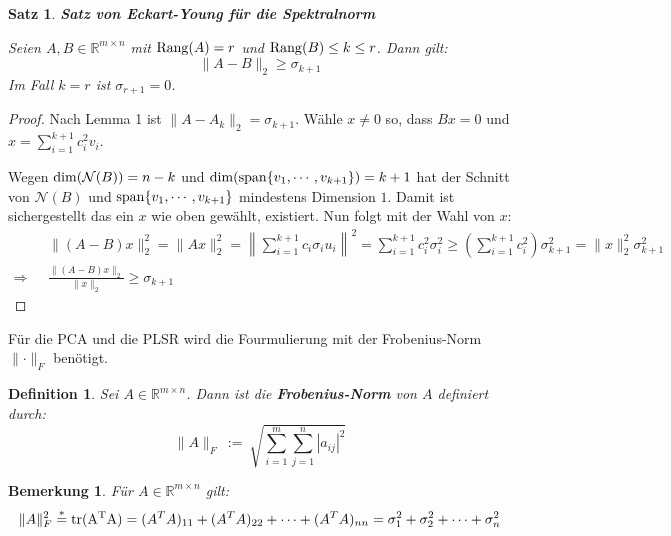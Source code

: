 \documentclass{article}
\newcommand{\R}[0]{\mathbb{R}}
\newtheorem{defin}{Definition}
\newtheorem{bem}{Bemerkung}
\newtheorem{thm}{Satz}
\begin{document}
\begin{thm} \textbf{Satz von Eckart-Young für die Spektralnorm}

    Seien $A, B \in \R^{m \times n}$ mit ${\rm Rang}(A) = r$ und ${\rm Rang}(B) \leq k \leq r$. Dann gilt:
    \begin{equation}
        \lVert A - B \rVert_2 \geq \sigma_{k+1}
    \end{equation}
    Im Fall $k = r$ ist $\sigma_{r+1} = 0$.
\end{thm}

\begin{proof}
    Nach Lemma 1 ist $\lVert A - A_k \rVert_2 = \sigma_{k+1}$. Wähle $x \neq 0$ so, dass $Bx = 0$ und $x = \sum\limits_{i=1}^{k+1} c_i^2v_i$.

    Wegen ${\rm dim}(\mathcal{N}(B)) = n - k$ und ${\rm dim}({\rm span}\{v_1, \cdots, v_{k+1}\}) = k + 1$ hat der Schnitt von $\mathcal{N}(B)$ und ${\rm span}\{v_1, \cdots, v_{k+1}\}$ mindestens Dimension $1$. 
    Damit ist sichergestellt das ein $x$ wie oben gewählt, existiert. Nun folgt mit der Wahl von $x$:
    \begin{align*}
        &\lVert(A-B)x\rVert_2^2 = \lVert Ax \rVert^2_2 = \left\lVert \sum\limits_{i=1}^{k+1} c_i\sigma_i u_i \right\rVert^2 = \sum\limits_{i=1}^{k+1}c_i^2\sigma_i^2 \geq \left(\sum\limits_{i=1}^{k+1}c_i^2\right)\sigma_{k+1}^2 = \lVert x \rVert_2^2 \sigma_{k+1}^2 \\
    \Rightarrow \:\:\: &\frac{\lVert (A - B)x \rVert_2}{\lVert x \rVert_2} \geq \sigma_{k+1}
    \end{align*}
\end{proof}

Für die PCA und die PLSR wird die Fourmulierung mit der Frobenius-Norm $\lVert \cdot \rVert_F$ benötigt.

\begin{defin}
    Sei $A \in \R^{m \times n}$. Dann ist die \textbf{Frobenius-Norm} von $A$ definiert durch:
    \begin{equation}
        \lVert A \rVert_F \: := \: \sqrt{\sum_{i=1}^{m}\sum_{j=1}^{n} |a_{ij}|^2}
    \end{equation}
\end{defin}

\begin{bem}
    Für $A \in \R^{m \times n}$ gilt:
    \begin{equation}
        \lVert A \rVert_F^2 \overset{*}{=} {\rm tr(A^TA)} = (A^TA)_{11} + (A^TA)_{22} + \cdots + (A^TA)_{nn} = \sigma_1^2 + \sigma_2^2 + \cdots + \sigma_n^2        
    \end{equation}
\end{bem}
\end{document}

